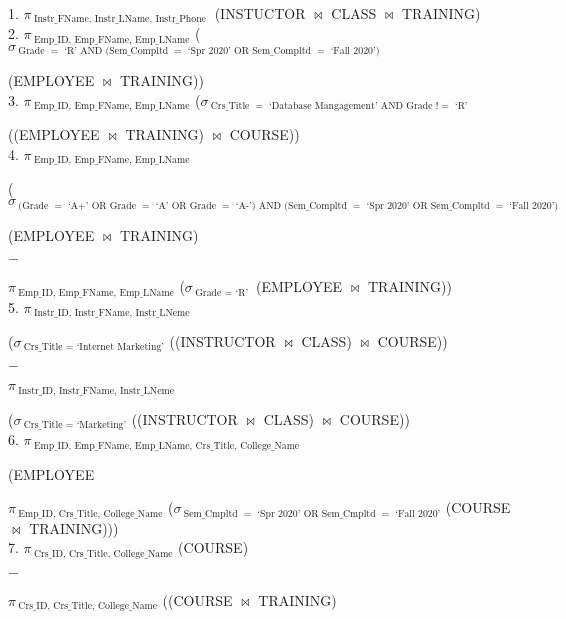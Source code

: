\documentclass[letterpaper,12pt]{article}
\begin{document}
1. $\pi\,_{\text{Instr\_FName, Instr\_LName, Instr\_Phone }}$ (INSTUCTOR $\bowtie$ CLASS $\bowtie$ TRAINING) \\

2. $\pi\,_{\text{Emp\_ID, Emp\_FName, Emp\_LName}}$ ($\sigma\,_{\text{Grade $=$ `R' AND (Sem\_Compltd\ $=$ `Spr 2020' OR Sem\_Compltd\ $=$ `Fall 2020')}}$ 


(EMPLOYEE $\bowtie$ TRAINING)) \\


3. $\pi\,_{\text{Emp\_ID, Emp\_FName, Emp\_LName}}$ ($\sigma\,_{\text{Crs\_Title $=$ `Database Mangagement' AND Grade $!=$ `R'}}$ 


((EMPLOYEE $\bowtie$ TRAINING) $\bowtie$ COURSE))  \\

4. $\pi\,_{\text{Emp\_ID, Emp\_FName, Emp\_LName}}$ 

($\sigma\,_{\text{(Grade $=$ `A+' OR Grade $=$ `A' OR Grade $=$ `A-')\ AND\ (Sem\_Compltd $=$ `Spr 2020' OR Sem\_Compltd $=$ `Fall 2020')}}$ 


(EMPLOYEE $\bowtie$ TRAINING) 


$-$


$ \pi\,_{\text{Emp\_ID, Emp\_FName, Emp\_LName}}$ ($\sigma\,_{\text{Grade $=$ `R'}}$\ (EMPLOYEE $\bowtie$ TRAINING)) \\


5. $\pi\,_{\text{Instr\_ID, Instr\_FName, Instr\_LNeme}}$


($\sigma\,_{\text{Crs\_Title\ = `Internet Marketing'}}$ ((INSTRUCTOR $\bowtie$ CLASS) $\bowtie$ COURSE))


$-$


$\pi\,_{\text{Instr\_ID, Instr\_FName, Instr\_LNeme}}$


($\sigma\,_{\text{Crs\_Title $=$ `Marketing'}}$ ((INSTRUCTOR $\bowtie$ CLASS) $\bowtie$ COURSE))  \\

6. $\pi\,_{\text{Emp\_ID, Emp\_FName, Emp\_LName, Crs\_Title, College\_Name}}$ 


(EMPLOYEE \quad 


$\pi\,_{\text{Emp\_ID, Crs\_Title, College\_Name}}$ ($\sigma\,_{\text{Sem\_Cmpltd $=$ `Spr 2020' OR Sem\_Cmpltd\ $=$ `Fall 2020'}}$ (COURSE $\bowtie$ TRAINING))) \\

7. $\pi\,_{\text{Crs\_ID, Crs\_Title, College\_Name}}$ (COURSE) 


$-$


$\pi\,_{\text{Crs\_ID, Crs\_Title, College\_Name}}$ ((COURSE $\bowtie$ TRAINING) \\
\end{document}
